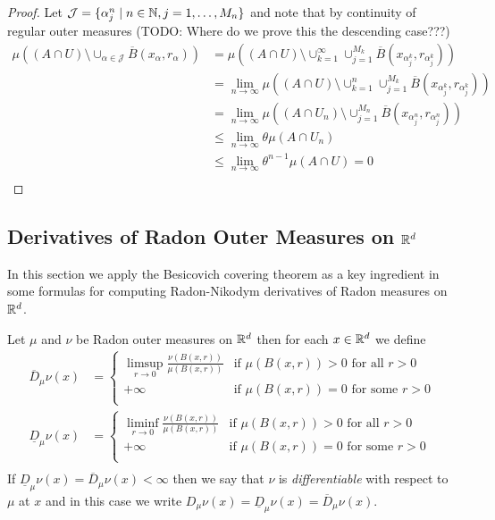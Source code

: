 \begin{proof}
Let $\mathcal{J} = \lbrace \alpha^n_j \mid n \in \mathbb{N}, j=1, \dotsc, M_n \rbrace$ and note that by continuity of regular outer measures (TODO: Where do we prove this the descending case???)
\begin{align*}
\mu \left( (A \cap U) \setminus \cup_{\alpha \in \mathcal{J}} \overline{B}(x_\alpha, r_\alpha) \right)
&=\mu \left( (A \cap U) \setminus \cup_{k=1}^\infty \cup_{j=1}^{M_k} \overline{B}(x_{\alpha^k_j}, r_{\alpha^k_j})\right) \\
&= \lim_{n \to \infty} \mu \left( (A \cap U) \setminus \cup_{k=1}^n \cup_{j=1}^{M_k} \overline{B}(x_{\alpha^k_j}, r_{\alpha^k_j})\right) \\
&= \lim_{n \to \infty} \mu \left( (A \cap U_n) \setminus \cup_{j=1}^{M_n} \overline{B}(x_{\alpha^n_j}, r_{\alpha^n_j})\right) \\
&\leq \lim_{n \to \infty} \theta \mu(A \cap U_n) \\
&\leq \lim_{n \to \infty} \theta^{n-1} \mu(A \cap U)  = 0\\
\end{align*}
\end{proof}

\subsection{Derivatives of Radon Outer Measures on $\mathbb{R}^d$}

In this section we apply the Besicovich covering theorem as a key ingredient in some formulas for computing Radon-Nikodym derivatives of Radon measures on $\mathbb{R}^d$.

\begin{defn}Let $\mu$ and $\nu$ be Radon outer measures on $\mathbb{R}^d$
  then for each $x \in \mathbb{R}^d$ we define 
\begin{align*}
\overline{D}_\mu \nu(x) &= \begin{cases}
\limsup_{r \to 0} \frac {\nu(B(x, r))}{\mu(B(x,r))} & \text{if  $\mu(B(x,r)) > 0$ for all $r>0$} \\
+\infty & \text{if  $\mu(B(x,r)) = 0$ for some $r>0$} \\
\end{cases} \\
\underline{D}_\mu \nu(x) &= \begin{cases}
\liminf_{r \to 0} \frac {\nu(B(x, r))}{\mu(B(x,r))} & \text{if  $\mu(B(x,r)) > 0$ for all $r>0$} \\
+\infty & \text{if  $\mu(B(x,r)) = 0$ for some $r>0$} \\
\end{cases} \\
\end{align*}
If $\underline{D}_\mu \nu(x) = \overline{D}_\mu \nu(x) < \infty$ then we say that $\nu$ is \emph{differentiable} with respect to $\mu$ at $x$
and in this case we write $D_\mu \nu(x) = \underline{D}_\mu \nu(x) = \overline{D}_\mu \nu(x)$.
\end{defn}

